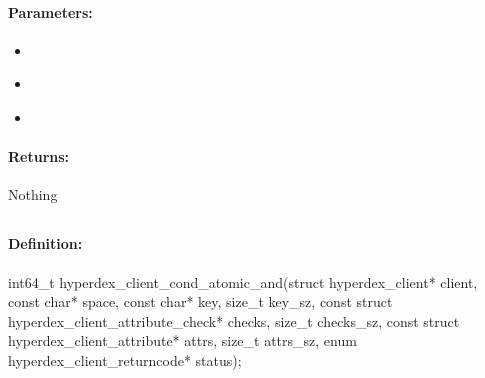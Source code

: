 \paragraph{Parameters:}
\begin{itemize}[noitemsep]
\item {}\\

\item {}\\

\item {}\\

\end{itemize}

\paragraph{Returns:}
Nothing
\pagebreak
\subsection{}
\label{api:c:cond_atomic_and}


\paragraph{Definition:}
\begin{ccode}
int64_t hyperdex_client_cond_atomic_and(struct hyperdex_client* client,
        const char* space,
        const char* key, size_t key_sz,
        const struct hyperdex_client_attribute_check* checks, size_t checks_sz,
        const struct hyperdex_client_attribute* attrs, size_t attrs_sz,
        enum hyperdex_client_returncode* status);
\end{ccode}

